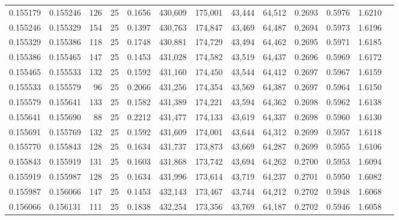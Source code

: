\begin{tabular}{rrrrrrrrrrrrr}
0.155179 & 0.155246 &   126 &  25 &                                     0.1656 & 430,609 & 175,001 &  43,444 &  64,512 & 0.2693 & 0.5976 & 1.6210 \\
0.155246 & 0.155329 &   154 &  25 &                                     0.1397 & 430,763 & 174,847 &  43,469 &  64,487 & 0.2694 & 0.5973 & 1.6196 \\
0.155329 & 0.155386 &   118 &  25 &                                     0.1748 & 430,881 & 174,729 &  43,494 &  64,462 & 0.2695 & 0.5971 & 1.6185 \\
0.155386 & 0.155465 &   147 &  25 &                                     0.1453 & 431,028 & 174,582 &  43,519 &  64,437 & 0.2696 & 0.5969 & 1.6172 \\
0.155465 & 0.155533 &   132 &  25 &                                     0.1592 & 431,160 & 174,450 &  43,544 &  64,412 & 0.2697 & 0.5967 & 1.6159 \\
0.155533 & 0.155579 &    96 &  25 &                                     0.2066 & 431,256 & 174,354 &  43,569 &  64,387 & 0.2697 & 0.5964 & 1.6150 \\
0.155579 & 0.155641 &   133 &  25 &                                     0.1582 & 431,389 & 174,221 &  43,594 &  64,362 & 0.2698 & 0.5962 & 1.6138 \\
0.155641 & 0.155690 &    88 &  25 &                                     0.2212 & 431,477 & 174,133 &  43,619 &  64,337 & 0.2698 & 0.5960 & 1.6130 \\
0.155691 & 0.155769 &   132 &  25 &                                     0.1592 & 431,609 & 174,001 &  43,644 &  64,312 & 0.2699 & 0.5957 & 1.6118 \\
0.155770 & 0.155843 &   128 &  25 &                                     0.1634 & 431,737 & 173,873 &  43,669 &  64,287 & 0.2699 & 0.5955 & 1.6106 \\
0.155843 & 0.155919 &   131 &  25 &                                     0.1603 & 431,868 & 173,742 &  43,694 &  64,262 & 0.2700 & 0.5953 & 1.6094 \\
0.155919 & 0.155987 &   128 &  25 &                                     0.1634 & 431,996 & 173,614 &  43,719 &  64,237 & 0.2701 & 0.5950 & 1.6082 \\
0.155987 & 0.156066 &   147 &  25 &                                     0.1453 & 432,143 & 173,467 &  43,744 &  64,212 & 0.2702 & 0.5948 & 1.6068 \\
0.156066 & 0.156131 &   111 &  25 &                                     0.1838 & 432,254 & 173,356 &  43,769 &  64,187 & 0.2702 & 0.5946 & 1.6058 \\

\end{tabular}
